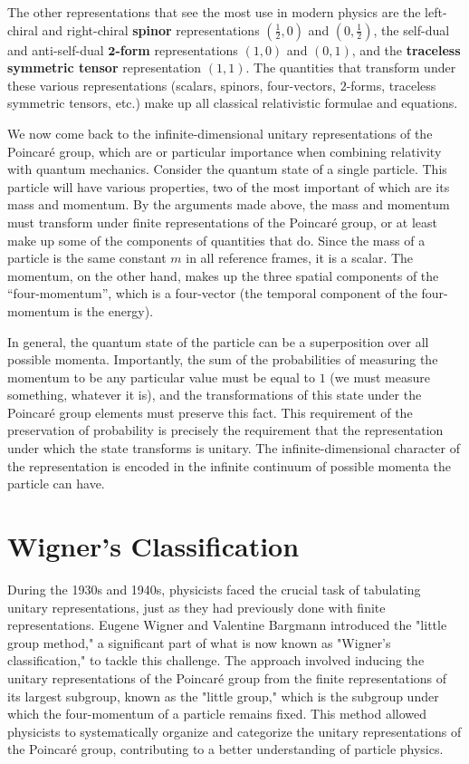 \documentclass[12pt]{article}
\begin{document}
The other representations that see the most use in modern physics are the left-chiral and right-chiral \textbf{spinor} representations $\left(\tfrac{1}{2},0\right)$ and $\left(0,\tfrac{1}{2}\right)$, the self-dual and anti-self-dual $\mathbf{2}$\textbf{-form} representations $\left(1,0\right)$ and $\left(0,1\right)$, and the \textbf{traceless symmetric tensor} representation $\left(1,1\right)$. The quantities that transform under these various representations (scalars, spinors, four-vectors, $2$-forms, traceless symmetric tensors, etc.) make up all classical relativistic formulae and equations.
\newline

We now come back to the infinite-dimensional unitary representations of the Poincaré group, which are or particular importance when combining relativity with quantum mechanics. Consider the quantum state of a single particle. This particle will have various properties, two of the most important of which are its mass and momentum. By the arguments made above, the mass and momentum must transform under finite representations of the Poincaré group, or at least make up some of the components of quantities that do. Since the mass of a particle is the same constant $m$ in all reference frames, it is a scalar. The momentum, on the other hand, makes up the three spatial components of the ``four-momentum'', which is a four-vector (the temporal component of the four-momentum is the energy).
\newline

In general, the quantum state of the particle can be a superposition over all possible momenta. Importantly, the sum of the probabilities of measuring the momentum to be any particular value must be equal to $1$ (we must measure something, whatever it is), and the transformations of this state under the Poincaré group elements must preserve this fact. This requirement of the preservation of probability is precisely the requirement that the representation under which the state transforms is unitary. The infinite-dimensional character of the representation is encoded in the infinite continuum of possible momenta the particle can have.

\section{Wigner's Classification}

During the 1930s and 1940s, physicists faced the crucial task of tabulating unitary representations, just as they had previously done with finite representations. Eugene Wigner and Valentine Bargmann introduced the "little group method," a significant part of what is now known as "Wigner's classification," to tackle this challenge. The approach involved inducing the unitary representations of the Poincaré group from the finite representations of its largest subgroup, known as the "little group," which is the subgroup under which the four-momentum of a particle remains fixed. This method allowed physicists to systematically organize and categorize the unitary representations of the Poincaré group, contributing to a better understanding of particle physics.
\end{document}
